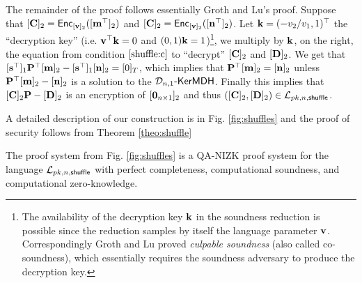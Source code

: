 The remainder of the proof follows essentially Groth and Lu's proof. Suppose that $[\mathbf{{C}}]_2=\mathsf{Enc}_{[\mathbf{v}]_2}([\mathbf{{m}}^\top]_2)$ and $[\mathbf{{C}}]_2=\mathsf{Enc}_{[\mathbf{v}]_2}([\mathbf{{n}}^\top]_2)$. Let $\mathbf{k}=(-v_2/v_1,1)^\top$ the ``decryption key'' (i.e. $\mathbf{v}^\top\mathbf{k}=0$ and $(0,1)\mathbf{k}=1$)\footnote{The availability of the decryption key $\mathbf{k}$ in the soundness reduction is possible since the reduction samples by itself the language parameter $\mathbf{v}$. Correspondingly Groth and Lu \cite{AC:GroLu07} proved \emph{culpable soundness} (also called co-soundness), which essentially requires the soundness adversary to produce the decryption key.}, we multiply by $\mathbf{{k}}$, on the right, the equation from condition $\ref{shuffle:c}$ to ``decrypt'' $[\mathbf{{C}}]_2$ and $[\mathbf{{D}}]_2$. We get that
$[\mathbf{s}^\top]_1\mathbf{{P}}^\top[\mathbf{{m}}]_2-[\mathbf{s}^\top]_1[\mathbf{{n}}]_2=[0]_T$, which implies that $\mathbf{{P}}^\top[\mathbf{{m}}]_2=[\mathbf{{n}}]_2$ unless $\mathbf{{P}}^\top[\mathbf{{m}}]_2-[\mathbf{{n}}]_2$ is a solution to the $\mathcal{D}_{n,1}\mbox{-}\mathsf{KerMDH}$. Finally this implies that $[\mathbf{{C}}]_2\mathbf{{P}}-[\mathbf{{D}}]_2$ is an encryption of $[\mathbf{{0}}_{n\times 1}]_2$ and thus $([\mathbf{{C}}]_2,[\mathbf{{D}}]_2)\in\mathcal{L}_{pk,n,\mathsf{shuffle}}$.

A detailed description of our construction is in Fig. \ref{fig:shuffles} and the proof of security follows from Theorem \ref{theo:shuffle}


\begin{theorem} \label{theo:shuffle}
The proof system from Fig. \ref{fig:shuffles} is a QA-NIZK proof system for the language $\mathcal{L}_{pk,n,\mathsf{shuffle}}$ with perfect completeness, computational soundness, and computational zero-knowledge.
\end{theorem}

